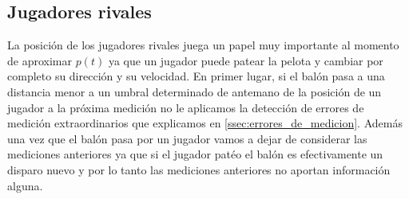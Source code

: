 \subsection{Jugadores rivales}
La posición de los jugadores rivales juega un papel muy importante al momento de aproximar $p(t)$ ya que un jugador puede 
patear la pelota y cambiar por completo su dirección y su velocidad. En primer lugar, si el balón pasa a una distancia menor a un umbral
determinado de antemano de la posición de un jugador a la próxima medición no le aplicamos la detección de errores de medición
extraordinarios que explicamos en \ref{ssec:errores_de_medicion}. Además una vez que el balón pasa por un jugador vamos a 
dejar de considerar las mediciones anteriores ya que si el jugador patéo el balón es efectivamente un disparo nuevo y por lo tanto las
mediciones anteriores no aportan información alguna.

















